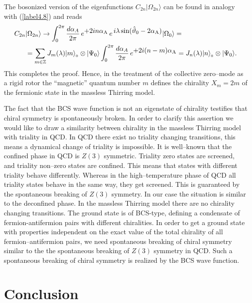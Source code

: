 \documentclass[a4paper,12pt] {article}
\begin{document}
The bosonized version of the eigenfunctions $C_{2n}|\Omega_{2n}\rangle$
can be found in analogy with (\ref{label4.8}) and reads
\cite{th0210104}
%
\begin{eqnarray}\label{label4.29}
\begin{aligned}
C_{2n}&|\Omega_{2n}\rangle \to
\int^{2\pi}_0\frac{d\alpha_{A}}{2\pi}\,e^{\textstyle +2in\alpha_{\rm
A}}\,e^{\textstyle \,i\lambda\sin(\hat{\vartheta}_0 - 2\alpha_{\rm
A})}|\Omega_0\rangle =\\ &= \sum_{m\in
\mathbb{Z}}J_m(\lambda)|m\rangle_{_0}\otimes |\Psi_0\rangle
\int^{2\pi}_0\frac{d\alpha_{A}}{2\pi}\,e^{\textstyle +2i(n -
m)\alpha_{\rm A}} = J_n(\lambda)|n\rangle_{_0}\otimes|\Psi_0\rangle.
\end{aligned}
\end{eqnarray}
%
This completes the proof. Hence, in the treatment of the collective
zero--mode as a rigid rotor the ``magnetic'' quantum number $m$
defines the chirality $X_m = 2m$ of the fermionic state in the
massless Thirring model.

The fact that the BCS wave function is not an eigenstate of chirality
testifies that chiral symmetry is spontaneously broken. In order to
clarify this assertion we would like to draw a similarity between
chirality in the massless Thirring model with triality in QCD. In QCD
there exist no triality changing transitions, this means a dynamical
change of triality is impossible. It is well--known that the confined
phase in QCD is $Z(3)$ symmetric. Triality zero states are screened,
and triality non--zero states are confined. This means that states
with different triality behave differently. Whereas in the
high--temperature phase of QCD all triality states behave in the same
way, they get screened. This is guaranteed by the spontaneous breaking
of $Z(3)$ symmetry. In our case the situation is similar to the
deconfined phase. In the massless Thirring model there are no
chirality changing transitions. The ground state is of BCS-type,
defining a condensate of fermion-antifermion pairs with different
chiralities. In order to get a ground state with properties
independent on the exact value of the total chirality of all
fermion--antifermion pairs, we need spontaneous breaking of chiral
symmetry similar to the the spontaneous breaking of $Z(3)$ symmetry in
QCD. Such a spontaneous breaking of chiral symmetry is realized by the
BCS wave function.


\section{Conclusion}
\end{document}
